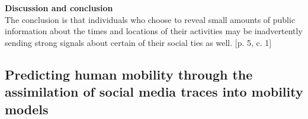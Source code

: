\textbf{Discussion and conclusion}\\
The conclusion is that individuals who choose to reveal small amounts of public information about the times and locations of their activities may be inadvertently sending strong signals about certain of their social ties as well. [p. 5, c. 1]



\subsection{Predicting human mobility through the assimilation of social media traces into mobility models \cite{human_mob_through_assi}}